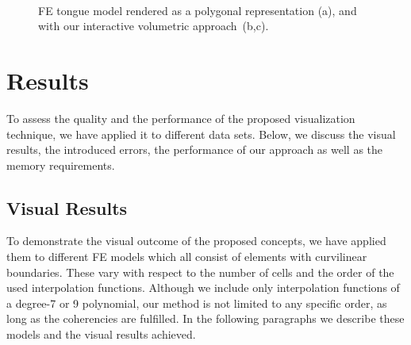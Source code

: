 \documentclass[journal]{vgtc}                %
\begin{document}
\begin{figure}
    \centering 
    \\
    \caption{FE tongue model rendered as a polygonal representation (a), and with our interactive volumetric approach~(b,c).}
    \label{fig:tongue}
\end{figure}
%
%
%
\section{Results}\label{sec:results}
To assess the quality and the performance of the proposed visualization technique, we have applied it to different data sets. Below, we discuss the visual results, the introduced errors, the performance of our approach as well as the memory requirements.
%
%
%
\subsection{Visual Results}
To demonstrate the visual outcome of the proposed concepts, we have applied them to different FE models which all consist of elements with curvilinear boundaries. These vary with respect to the number of cells and the order of the used interpolation functions. Although we include only interpolation functions of a degree-7 or 9 polynomial, our method is not limited to any specific order, as long as the coherencies are fulfilled. In the following paragraphs we describe these models and the visual results achieved.
\end{document}
